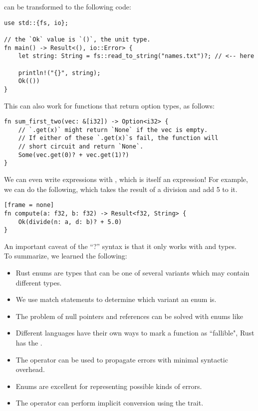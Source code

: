 can be transformed to the following code:

\begin{lstlisting}[frame = none]
use std::{fs, io};

// the `Ok` value is `()`, the unit type.
fn main() -> Result<(), io::Error> {
    let string: String = fs::read_to_string("names.txt")?; // <-- here

    println!("{}", string);
    Ok(())
}

\end{lstlisting}

This can also work for functions that return option types, as follows:
\begin{lstlisting}[frame = none]
fn sum_first_two(vec: &[i32]) -> Option<i32> {
    // `.get(x)` might return `None` if the vec is empty.
    // If either of these `.get(x)`s fail, the function will
    // short circuit and return `None`.
    Some(vec.get(0)? + vec.get(1)?)
}
\end{lstlisting}

We can even write expressions with , which is itself an expression! For example, we can do the following, which takes the result of a division and add 5 to it.
\begin{lstlisting}[frame = none][frame = none]
fn compute(a: f32, b: f32) -> Result<f32, String> {
    Ok(divide(n: a, d: b)? + 5.0)
}

\end{lstlisting}

An important caveat of the ``?'' syntax is that it only works with  and  types. \\

To summarize, we learned the following: \\

\begin{itemize}
    \item Rust enums are types that can be one of several variants which may contain different types.
    \item We use match statements to determine which variant an enum is.
    \item The problem of null pointers and references can be solved with enums like 
    \item Different languages have their own ways to mark a function as ``fallible", Rust has the .
    \item The  operator can be used to propagate errors with minimal syntactic overhead.
    \item Enums are excellent for representing possible kinds of errors.
    \item The  operator can perform implicit conversion using the  trait.
\end{itemize}